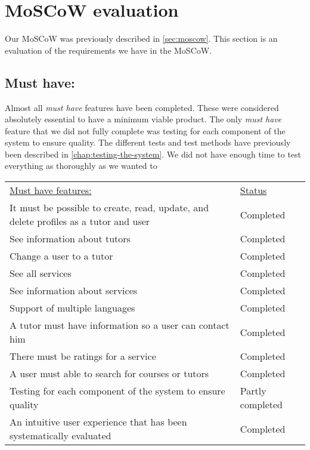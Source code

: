 \section{MoSCoW evaluation}
Our MoSCoW was previously described in \autoref{sec:moscow}. 
This section is an evaluation of the requirements we have in the MoSCoW.

\subsection{Must have:}
Almost all \textit{must have} features have been completed.
These were considered absolutely essential to have a minimum viable product. 
The only \textit{must have} feature that we did not fully complete was testing for each component of the system to ensure quality.
The different tests and test methods have previously been described in \autoref{chap:testing-the-system}.
We did not have enough time to test everything as thoroughly as we wanted to

\begin{table}[h]
    \begin{tabularx}{\textwidth}{|X|l|}
    \underline{Must have features:}                                                                   & \underline{Status} \\
    It must be possible to create, read, update, and delete profiles as a tutor and user              & Completed \\
    See information about tutors                                                                      & Completed \\
    Change a user to a tutor                                                                          & Completed \\
    See all services                                                                                  & Completed \\
    See information about services                                                                    & Completed \\
    Support of multiple languages                                                                     & Completed \\
    A tutor must have information so a user can contact him                                           & Completed \\
    There must be ratings for a service                                                                 & Completed \\
    A user must able to search for courses or tutors                                                  & Completed \\
    Testing for each component of the system to ensure quality                                        & Partly completed \\
    An intuitive user experience that has been systematically evaluated                               & Completed \\
    \end{tabularx}
\end{table}

